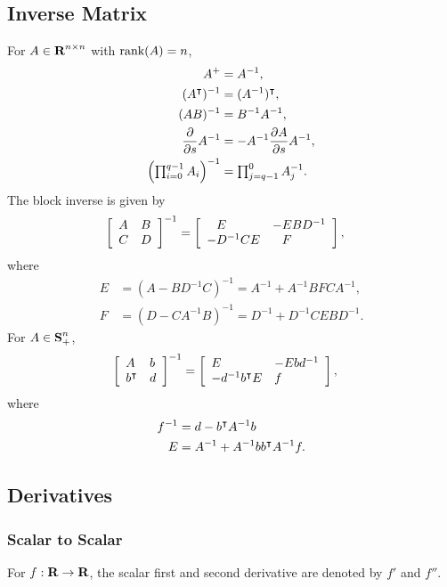 \documentclass{article}
\begin{document}
\subsection{Inverse Matrix}
    For $A\in\textbf{R}^{n\times n}$ with $\text{rank}(A)=n$,
    \begin{align*}
        A^+&=A^{-1},\\
        (A^\intercal)^{-1}&=(A^{-1})^\intercal,\\
        (AB)^{-1}&=B^{-1}A^{-1},\\
        \frac{\partial }{\partial s}A^{-1}&=-A^{-1}\frac{\partial A}{\partial s}A^{-1},\\
        \left(\textstyle\prod_{i=0}^{q-1}A_i\right)^{-1}&=\textstyle\prod_{j=q-1}^{0}A_j^{-1}.
    \end{align*}
    The block inverse is given by
    \begin{align*}    
        \mat{A & B \\ C & D}^{-1}&=\mat{
            \minus E&-EBD^{-1}\\
            -D^{-1}CE&\minus F
            },
    \end{align*}
    where
    \begin{align*}
        E&=(A-BD^{-1}C)^{-1} =A^{-1}+A^{-1}BFCA^{-1},\\
        F&=(D-CA^{-1}B)^{-1} =D^{-1}+D^{-1}CEBD^{-1}.
    \end{align*}
    For $A\in\textbf{S}_+^n$, 
    \begin{align*}    
        \left[\begin{array}{lllllllllllllllllll}A & b \\ b^\intercal  & d\end{array}\right]^{-1}&=\left[\begin{array}{lllllllllllllllllll}
            E&-Ebd^{-1}\\
            -d^{-1}b^\intercal E&f
            \end{array}\right],
    \end{align*}
    where
    \begin{align*}
        f^{-1}&=d-b^\intercal A^{-1}b\\
        E&=A^{-1}+A^{-1}bb^\intercal A^{-1}f.
    \end{align*}

\clearpage

    \subsection{Derivatives}

    \subsubsection{Scalar to Scalar}
        For $f:\textbf{R}\to\textbf{R}$, the scalar first and second derivative 
        are denoted by $f'$ and $f''$.\\
    
\end{document}
